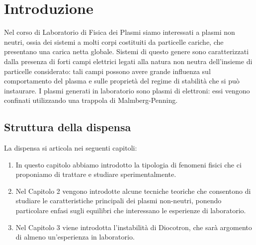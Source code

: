 \chapter{Introduzione}

Nel corso di Laboratorio di Fisica dei Plasmi siamo interessati a plasmi non neutri, ossia dei sistemi a molti corpi
costituiti da particelle cariche, che presentano una carica netta globale. Sistemi di questo genere sono caratterizzati
dalla presenza di forti campi elettrici legati alla natura non neutra dell'insieme di particelle considerato: tali campi
possono avere grande influenza sul comportamento del plasma e sulle proprietà del regime di stabilità che si può instaurare.
I plasmi generati in laboratorio sono plasmi di elettroni: essi vengono confinati utilizzando una trappola di Malmberg-Penning.

\section{Struttura della dispensa}

La dispensa si articola nei seguenti capitoli:
\begin{enumerate}
    \item In questo capitolo abbiamo introdotto la tipologia di fenomeni fisici che ci proponiamo di trattare
    e studiare sperimentalmente.
    \item Nel Capitolo 2 vengono introdotte alcune tecniche teoriche che consentono di studiare le caratteristiche principali
    dei plasmi non-neutri, ponendo particolare enfasi sugli equilibri che interessano le esperienze di laboratorio.
    \item Nel Capitolo 3 viene introdotta l'instabilità di Diocotron, che sarà argomento di almeno un'esperienza in laboratorio.
  \end{enumerate}
